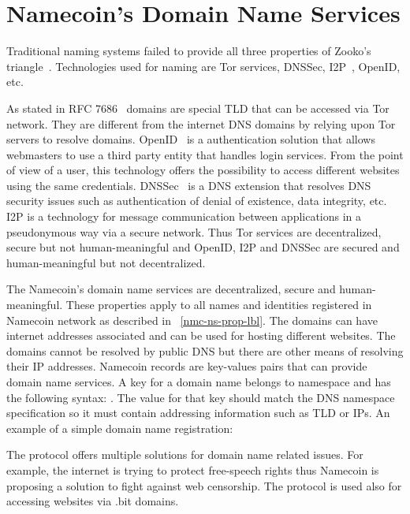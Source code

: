 \section{Namecoin's Domain Name Services}
\label{sec:dn-services-lbl}
Traditional naming systems failed to provide all three properties of Zooko's triangle~\cite{wilcox2001names}. Technologies used for naming are Tor services, DNSSec, I2P~, OpenID, etc.

As stated in RFC 7686~\cite{rfc7686}  domains are special TLD that can be accessed via Tor network. They are different from the internet DNS domains by relying upon Tor servers to resolve  domains.
OpenID~\cite{openid} is a authentication solution that allows webmasters to use a third party entity that handles login services. From the point of view of a user, this technology offers the possibility to access different websites using the same credentials. DNSSec~\cite{rfc2535} is a DNS extension that resolves DNS security issues such as authentication of denial of existence, data integrity, etc. I2P is a technology for message communication between applications in a pseudonymous way via a secure network. 
Thus Tor services are decentralized, secure but not human-meaningful and OpenID, I2P and DNSSec are secured and human-meaningful but not decentralized.

The Namecoin's domain name services are decentralized, secure and human-meaningful. These properties apply to all names and identities registered in Namecoin network as described in ~\ref{nmc-ns-prop-lbl}.
The  domains can have internet addresses associated and can be used for hosting different websites.
The  domains cannot be resolved by public DNS but there are other means of resolving their IP addresses.
Namecoin records are key-values pairs that can provide domain name services.
A key for a domain name belongs to namespace  and has the following syntax: . The value for that key should match the DNS namespace specification so it must contain addressing information such as TLD or IPs.
An example of a simple domain name registration:
 


The protocol offers multiple solutions for domain name related issues. For example, the internet is trying to protect free-speech rights thus Namecoin is proposing a solution to fight against web censorship. The protocol is used also for accessing websites via .bit domains.

